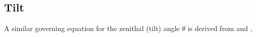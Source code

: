 %
%
%
%
%


\subsection{Tilt}
A similar governing equation for the zenithal (tilt) angle $\theta$ is derived from \cite{Cornford2008} and \cite{Stewart2004},

